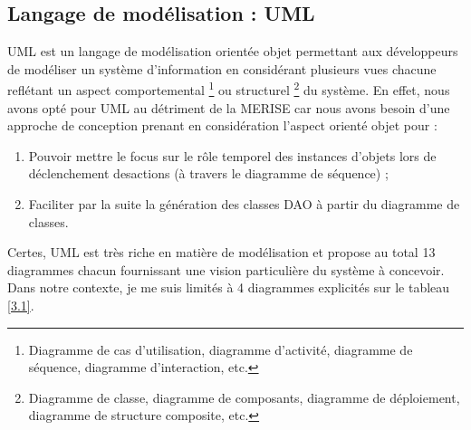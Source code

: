 \subsection{Langage de modélisation : UML}
UML est un langage de modélisation orientée objet permettant aux développeurs de modéliser un système d’information en considérant plusieurs vues chacune reflétant un aspect comportemental \footnote{Diagramme de cas d’utilisation, diagramme d’activité, diagramme de séquence, diagramme d’interaction, etc.} ou structurel \footnote{Diagramme de classe, diagramme de composants, diagramme de déploiement, diagramme de structure composite, etc.} du système.
\newline
En effet, nous avons opté pour UML au détriment de la MERISE car nous avons besoin
d’une approche de conception prenant en considération l’aspect orienté objet pour :
\begin{enumerate}
	\item Pouvoir mettre le focus sur le rôle temporel des instances d’objets lors de déclenchement desactions (à travers le diagramme de séquence) ;
	\item Faciliter par la suite la génération des classes DAO à partir du diagramme de classes.
\end{enumerate}
Certes, UML est très riche en matière de modélisation et propose au total 13 diagrammes chacun fournissant une vision particulière du système à concevoir. Dans notre contexte, je me suis limités à 4 diagrammes explicités sur le tableau \ref{3.1}.

